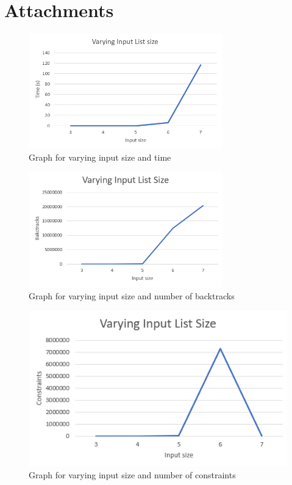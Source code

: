 \documentclass[runningheads]{llncs}
\begin{document}
\newpage
\section{Attachments}

\begin{figure}
    \centering
    \includegraphics[width=0.75\textwidth]{graph_size_time.png}
    \caption{Graph for varying input size and time}
    \label{graphSizeT}
\end{figure}

\begin{figure}
    \centering
    \includegraphics[width=0.75\textwidth]{graph_size_backs.png}
    \caption{Graph for varying input size and number of backtracks}
    \label{graphSizeB}
\end{figure}

\begin{figure}
    \centering
    \includegraphics[width=\textwidth]{graph_size_consts.png}
    \caption{Graph for varying input size and number of constraints}
    \label{graphSizeC}
\end{figure}
\end{document}

